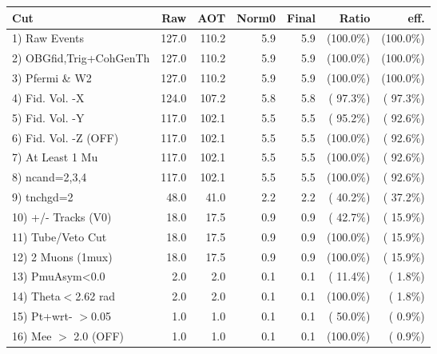  \begin{table}[h!]\centering
 \begin{tabular}{||l||r|r|r|r|r|r||}
 \hline
 \hline
 Cut & Raw & AOT & Norm0 & Final & Ratio & eff.       \\
 \hline
  1) Raw Events           &        127.0 &        110.2 &          5.9 &          5.9 & (100.0\%) & (100.0\%) \\
  2) OBGfid,Trig+CohGenTh &        127.0 &        110.2 &          5.9 &          5.9 & (100.0\%) & (100.0\%) \\
  3) Pfermi \& W2         &        127.0 &        110.2 &          5.9 &          5.9 & (100.0\%) & (100.0\%) \\
  4) Fid. Vol. -X         &        124.0 &        107.2 &          5.8 &          5.8 & ( 97.3\%) & ( 97.3\%) \\
  5) Fid. Vol. -Y         &        117.0 &        102.1 &          5.5 &          5.5 & ( 95.2\%) & ( 92.6\%) \\
  6) Fid. Vol. -Z (OFF)   &        117.0 &        102.1 &          5.5 &          5.5 & (100.0\%) & ( 92.6\%) \\
  7) At Least 1 Mu        &        117.0 &        102.1 &          5.5 &          5.5 & (100.0\%) & ( 92.6\%) \\
  8) ncand=2,3,4          &        117.0 &        102.1 &          5.5 &          5.5 & (100.0\%) & ( 92.6\%) \\
  9) tnchgd=2             &         48.0 &         41.0 &          2.2 &          2.2 & ( 40.2\%) & ( 37.2\%) \\
 10) +/- Tracks (V0)      &         18.0 &         17.5 &          0.9 &          0.9 & ( 42.7\%) & ( 15.9\%) \\
 11) Tube/Veto Cut        &         18.0 &         17.5 &          0.9 &          0.9 & (100.0\%) & ( 15.9\%) \\
 12) 2 Muons (1mux)       &         18.0 &         17.5 &          0.9 &          0.9 & (100.0\%) & ( 15.9\%) \\
 13) PmuAsym<0.0          &          2.0 &          2.0 &          0.1 &          0.1 & ( 11.4\%) & (  1.8\%) \\
 14) Theta$<$2.62 rad     &          2.0 &          2.0 &          0.1 &          0.1 & (100.0\%) & (  1.8\%) \\
 15) Pt+wrt- $>$0.05      &          1.0 &          1.0 &          0.1 &          0.1 & ( 50.0\%) & (  0.9\%) \\
 16) Mee $>$ 2.0  (OFF)   &          1.0 &          1.0 &          0.1 &          0.1 & (100.0\%) & (  0.9\%) \\

\end{tabular}
\end{table}
